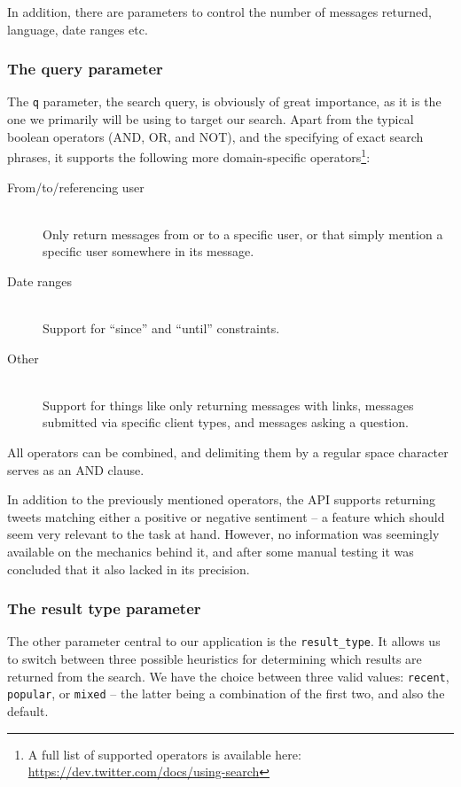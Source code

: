 In addition, there are parameters to control the number of messages returned, language, date ranges etc.

\subsubsection{The query parameter}

The \texttt{q} parameter, the search query, is obviously of great importance, as it is the one we primarily will be using to target our search. Apart from the typical boolean operators (AND, OR, and NOT), and the specifying of exact search phrases, it supports the following more domain-specific operators\footnote{A full list of supported operators is available here: \url{https://dev.twitter.com/docs/using-search}}:

\begin{description}
  \item[From/to/referencing user] \hfill \\
    Only return messages from or to a specific user, or that simply mention a specific user somewhere in its message.
  \item[Date ranges] \hfill \\
    Support for ``since'' and ``until'' constraints.
  \item[Other] \hfill \\
    Support for things like only returning messages with links, messages submitted via specific client types, and messages asking a question.
\end{description}

All operators can be combined, and delimiting them by a regular space character serves as an AND clause.

In addition to the previously mentioned operators, the API supports returning tweets matching either a positive or negative sentiment -- a feature which should seem very relevant to the task at hand. However, no information was seemingly available on the mechanics behind it, and after some manual testing it was concluded that it also lacked in its precision.

\subsubsection{The result type parameter}

The other parameter central to our application is the \texttt{result\_type}. It allows us to switch between three possible heuristics for determining which results are returned from the search. We have the choice between three valid values: \texttt{recent}, \texttt{popular}, or \texttt{mixed} -- the latter being a combination of the first two, and also the default.

